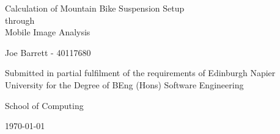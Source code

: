 \begin{titlepage}
	\begin{center}
		
		\vspace*{3cm}
		{\LARGE Calculation of Mountain Bike Suspension Setup\\through\\Mobile Image Analysis}
		
		\vspace{3cm}
		{\large Joe Barrett - 40117680}

		\vfill
		Submitted in partial fulfilment of the requirements of Edinburgh Napier University for the Degree of BEng (Hons) Software Engineering
		
		\vspace{1cm}
		School of Computing
		
		\vspace{1cm}
		\today
	\end{center}
\end{titlepage}